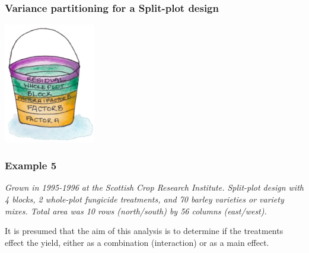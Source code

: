 \begin{frame}\frametitle{Variance partitioning for a Split-plot design}
\centering
\includegraphics[width = 4cm]{SPBucket.png}
\end{frame}



\begin{frame}\frametitle{Example 5}
\textit{Grown in 1995-1996 at the Scottish Crop Research Institute.   Split-plot design with 4 blocks,  2 whole-plot
fungicide treatments, and 70 barley varieties or variety mixes.  Total area was 10 rows (north/south) by 56 columns
(east/west).}


It is presumed that the aim of this analysis is to determine if the treatments effect the yield, either as a
combination (interaction) or as a main effect.

\end{frame}


